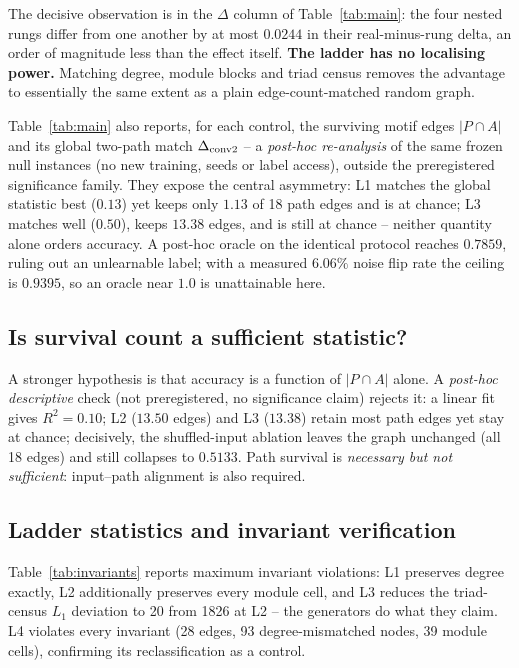 \documentclass[10pt,twocolumn,letterpaper]{article}
\begin{document}
The decisive observation is in the $\Delta$ column of Table~\ref{tab:main}: the
four nested rungs differ from one another by at most $0.0244$ in their
real-minus-rung delta, an order of magnitude less than the effect itself.
\textbf{The ladder has no localising power.} Matching degree, module blocks and
triad census removes the advantage to essentially the same extent as a plain
edge-count-matched random graph.

Table~\ref{tab:main} also reports, for each control, the surviving motif edges
$|P\cap A|$ and its global two-path match $\Delta_{\rm conv2}$ -- a \emph{post-hoc
re-analysis} of the same frozen null instances (no new training, seeds or label
access), outside the preregistered significance family. They expose the central
asymmetry: L1 matches the global statistic best ($0.13$) yet keeps only $1.13$
of 18 path edges and is at chance; L3 matches well ($0.50$), keeps $13.38$
edges, and is still at chance -- neither quantity alone orders accuracy. A
post-hoc oracle on the identical protocol reaches $0.7859$, ruling out an
unlearnable label; with a measured $6.06\%$ noise flip rate the ceiling is
$0.9395$, so an oracle near $1.0$ is unattainable here.

\subsection{Is survival count a sufficient statistic?}
\label{sec:survival}

A stronger hypothesis is that accuracy is a function of $|P\cap A|$ alone. A
\emph{post-hoc descriptive} check (not preregistered, no significance claim)
rejects it: a linear fit gives $R^2=0.10$; L2 ($13.50$ edges) and L3 ($13.38$)
retain most path edges yet stay at chance; decisively, the shuffled-input
ablation leaves the graph unchanged (all 18 edges) and still collapses to
$0.5133$. Path survival is \emph{necessary but not sufficient}: input--path
alignment is also required.

\subsection{Ladder statistics and invariant verification}
\label{sec:invariants}

Table~\ref{tab:invariants} reports maximum invariant violations: L1 preserves
degree exactly, L2 additionally preserves every module cell, and L3 reduces
the triad-census $L_1$ deviation to 20 from 1826 at L2 -- the generators do
what they claim. L4 violates every invariant (28 edges, 93 degree-mismatched
nodes, 39 module cells), confirming its reclassification as a control.
\end{document}
